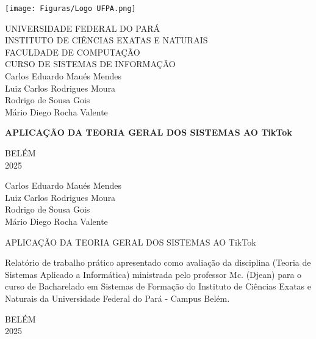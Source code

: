 
\begin{center}
    \thispagestyle{empty} %
    \texttt{[image: Figuras/Logo UFPA.png]}
    \onehalfspacing

    UNIVERSIDADE FEDERAL DO PARÁ \\
    INSTITUTO DE CIÊNCIAS EXATAS E NATURAIS \\
    FACULDADE DE COMPUTAÇÃO\\
    CURSO DE SISTEMAS DE INFORMAÇÃO \\
    
    \vspace{4cm}
    Carlos Eduardo Maués Mendes\\
    Luiz Carlos Rodrigues Moura\\
    Rodrigo de Sousa Gois\\
    Mário Diego Rocha Valente\\
    \vspace{5cm}
    
    \textbf{APLICAÇÃO DA TEORIA GERAL DOS SISTEMAS AO TikTok}\\
    \vspace{5cm}
    
    BELÉM\\
    2025\\
    

    \newpage
    \setcounter{page}{1} %
    \thispagestyle{empty}
    
    Carlos Eduardo Maués Mendes\\
    Luiz Carlos Rodrigues Moura\\
    Rodrigo de Sousa Gois\\
    Mário Diego Rocha Valente\\
    \vspace{5cm}
    
    APLICAÇÃO DA TEORIA GERAL DOS SISTEMAS AO TikTok\\
    \vspace{5cm}
    
\end{center}

\singlespacing
\hspace{8cm} %
\begin{minipage}{7cm}
Relatório de trabalho prático apresentado como avaliação da disciplina (Teoria de Sistemas Aplicado a Informática) ministrada pelo professor Mc. (Djean) para o curso de Bacharelado em Sistemas de Formação do Instituto de Ciências Exatas e Naturais da Universidade Federal do Pará - Campus Belém. 
\end{minipage}
\vspace{4cm}

\onehalfspacing
\begin{center}
    BELÉM\\
    2025
\end{center}

\newpage
\thispagestyle{empty}
\begin{center}
\tableofcontents


\end{center}
